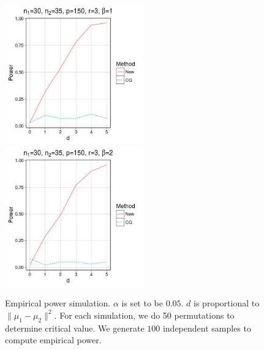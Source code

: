 \documentclass[review]{elsarticle}
\theoremstyle{plain}
\theoremstyle{definition}
\theoremstyle{remark}
\begin{document}
\begin{figure}
    \\
    \includegraphics[height=6cm]{code/fig5.jpeg}
    \includegraphics[height=6cm]{code/fig6.jpeg}
    \caption{Empirical power simulation. $\alpha$ is set to be $0.05$. $d$ is proportional to $\|\mu_1-\mu_2\|^2$. For each simulation, we do 50 permutations to determine critical value. We generate $100$ independent samples to compute empirical power. }\label{fig:fig2}
\end{figure}


\end{document}
